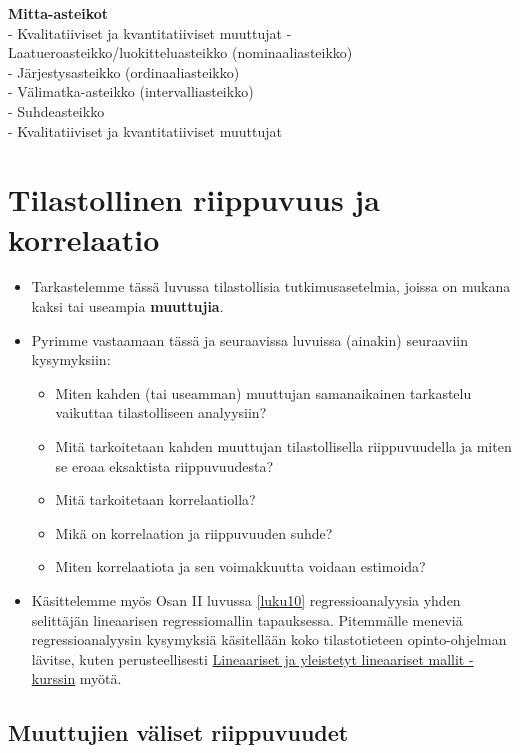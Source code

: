 \documentclass[
]{book}
\providecommand{\tightlist}{%
  \setlength{\itemsep}{0pt}\setlength{\parskip}{0pt}}
\begin{document}
\textbf{Mitta-asteikot}\\
- Kvalitatiiviset ja kvantitatiiviset muuttujat
- Laatueroasteikko/luokitteluasteikko (nominaaliasteikko)\\
- Järjestysasteikko (ordinaaliasteikko)\\
- Välimatka-asteikko (intervalliasteikko)\\
- Suhdeasteikko\\
- Kvalitatiiviset ja kvantitatiiviset muuttujat


\hypertarget{luku6}{%
\chapter{Tilastollinen riippuvuus ja korrelaatio}\label{luku6}}

\begin{itemize}
\item
  Tarkastelemme tässä luvussa tilastollisia tutkimusasetelmia, joissa on mukana kaksi tai useampia \textbf{muuttujia}.
\item
  Pyrimme vastaamaan tässä ja seuraavissa luvuissa (ainakin) seuraaviin kysymyksiin:

  \begin{itemize}
  \tightlist
  \item
    Miten kahden (tai useamman) muuttujan samanaikainen tarkastelu vaikuttaa tilastolliseen analyysiin?
  \item
    Mitä tarkoitetaan kahden muuttujan tilastollisella riippuvuudella ja miten se eroaa eksaktista riippuvuudesta?
  \item
    Mitä tarkoitetaan korrelaatiolla?
  \item
    Mikä on korrelaation ja riippuvuuden suhde?
  \item
    Miten korrelaatiota ja sen voimakkuutta voidaan estimoida?
  \end{itemize}
\item
  Käsittelemme myös Osan II luvussa \ref{luku10} regressioanalyysia yhden selittäjän lineaarisen regressiomallin tapauksessa. Pitemmälle meneviä regressioanalyysin kysymyksiä käsitellään koko tilastotieteen opinto-ohjelman lävitse, kuten perusteellisesti \href{https://opas.peppi.utu.fi/fi/opintojakso/TILM3588/5071?period=2024-2027}{Lineaariset ja yleistetyt lineaariset mallit -kurssin} myötä.
\end{itemize}

\hypertarget{alaluku61}{%
\section{Muuttujien väliset riippuvuudet}\label{alaluku61}}
\end{document}
